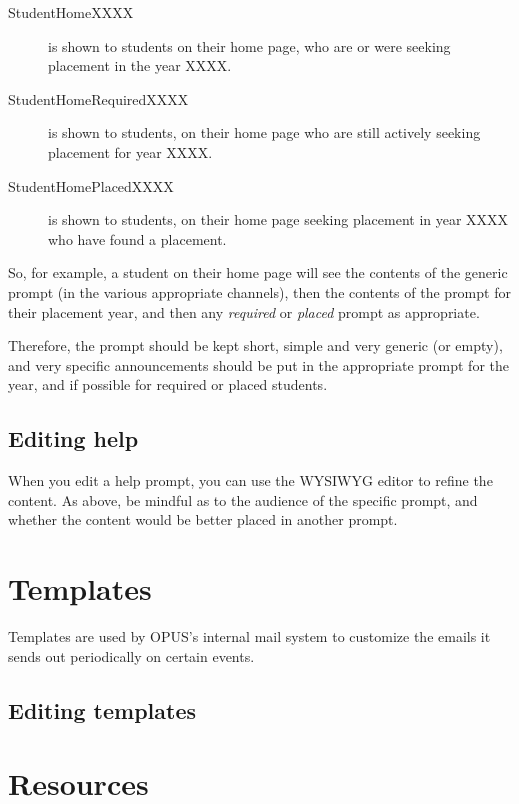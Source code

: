 \documentclass[12 pt]{book}
\begin{document}
\begin{description}
  \item[StudentHomeXXXX] is shown to students on their home page, 
  who are or were seeking placement in the year XXXX.
  \item[StudentHomeRequiredXXXX] is shown to students, on their home
  page who are still actively seeking placement for year XXXX.
  \item[StudentHomePlacedXXXX] is shown to students, on their home
  page seeking placement in year XXXX who have found a placement.
\end{description}

So, for example, a student on their home page will see the contents
of the generic  prompt (in the various appropriate
channels), then the contents of the  prompt
for their placement year, and then any \emph{required} or \emph{placed}
prompt as appropriate.

Therefore, the  prompt should be kept short,
simple and very generic (or empty), and very specific announcements
should be put in the appropriate prompt for the year, and if possible
for required or placed students.

\subsection{Editing help}

When you edit a help prompt, you can use the WYSIWYG editor to refine
the content. As above, be mindful as to the audience of the specific
prompt, and whether the content would be better placed in another
prompt.

\section{Templates}
\label{Templates}

Templates are used by OPUS's internal mail system to customize the 
emails it sends out periodically on certain events.

\subsection{Editing templates}



\section{Resources}
\label{Resources}
\end{document}
